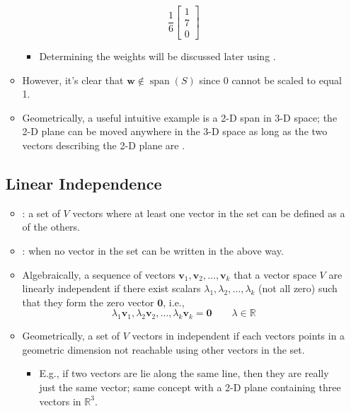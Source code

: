 \begin{itemize}
\begin{itemize}
\[    \frac{1}{6}\begin{bmatrix} 1 \\ 7 \\ 0 \end{bmatrix} 
    \]%
    \begin{itemize}
      \item Determining the weights will be discussed later using \hyperref[tbd]{}.
    \end{itemize}
    \item However, it's clear that \(\bm{w}\notin \operatorname{span}(S) \) since 0 cannot be scaled to equal 1.
    \item Geometrically, a useful intuitive example is a 2-D span in 3-D space; the 2-D plane can be moved anywhere in the 3-D space as long as the two vectors describing the 2-D plane are \hyperref[Linear Independence]{}.
  \end{itemize}
  
  \subsection{Linear Independence}\label{Linear Independence}
  \begin{itemize}
    \item {}: a set of \(V\) vectors where at least one vector in the set can be defined as a \hyperref[Linear combination]{} of the others.
    \item {}: when no vector in the set can be written in the above way. 
    \item Algebraically, a sequence of vectors \(\bm{v}_1,\bm{v}_2,\dots,\bm{v}_k\) that a vector space \(V\) are linearly independent if there exist scalars \(\lambda_1,\lambda_2,\dots,\lambda_k\) (not all zero) such that they form the zero vector \(\bm{0}\), i.e.,
    \[%
    \lambda_1\bm{v}_1,\lambda_2\bm{v}_2,\dots,\lambda_k\bm{v}_k = \bm{0} \qquad \lambda \in \mathbb{R}
    \]%
    \item Geometrically, a set of \(V\) vectors in independent if each vectors points in a geometric dimension not reachable using other vectors in the set.
    \begin{itemize}
      \item E.g., if two vectors are lie along the same line, then they are really just the same vector; same concept with a 2-D plane containing three vectors in \(\mathbb{R}^3\).
    \end{itemize}
    \end{itemize}
  

\end{itemize}
